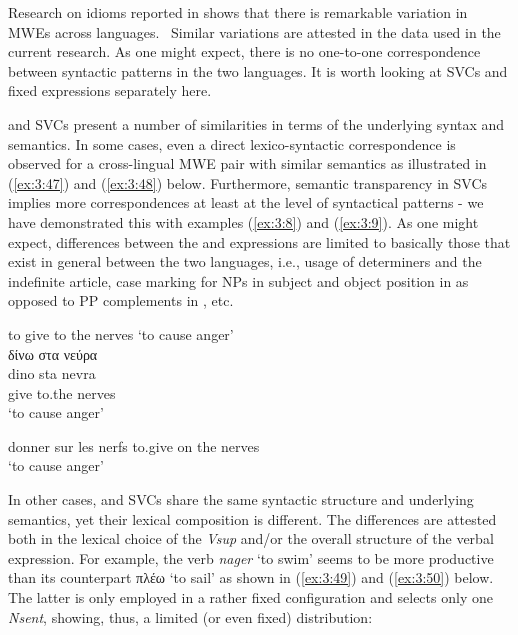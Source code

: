 \documentclass[output=paper]{langsci/langscibook}
\begin{document}
Research on idioms reported in \cite{villavicencio2004} shows that
there is remarkable variation in MWEs across languages. \ Similar
variations are attested in the data used in the current research. As
one might expect, there is no one-to-one correspondence between
syntactic patterns in the two languages. It is worth looking at SVCs
and fixed expressions separately here.



 and  SVCs present a number of similarities in terms of the
underlying syntax and semantics. In some cases, even a direct
lexico-syntactic correspondence is observed for a cross-lingual MWE
pair with similar semantics as illustrated in (\ref{ex:3:47}) and (\ref{ex:3:48}) below.
Furthermore, semantic transparency in SVCs implies more correspondences
at least at the level of syntactical patterns - we have demonstrated this with examples (\ref{ex:3:8}) and
(\ref{ex:3:9}). As one might expect, differences between the  and 
expressions are limited to basically those that exist in general
between the two languages, i.e., usage of determiners and the
indefinite article, case marking for NPs in subject and object position
in  as opposed to PP complements in , etc.

\begin{exe}
\ex \label{ex:3:47}
to give to the nerves `to cause anger'\\
\glll δίνω στα νεύρα \\
dino sta nevra\\
give to.the nerves\\
\glt %
‘to cause anger’
\end{exe}

\begin{exe}
\ex \label{ex:3:48} donner sur les nerfs
\glt to.give on the nerves\\
‘to cause anger’
\end{exe}



In other cases,  and  SVCs share the same syntactic structure and
underlying semantics, yet their lexical composition is different. The
differences are attested both in the lexical choice of the
\textit{Vsup} and/or the overall structure of the verbal expression.
For example, the  verb \textit{nager} ‘to swim’ seems to
be more productive than its  counterpart πλέω ‘to sail’ as
shown in (\ref{ex:3:49}) and (\ref{ex:3:50}) below. The latter is only employed in a rather
fixed configuration and selects only one \textit{Nsent}, showing, thus,
a limited (or even fixed) distribution: 
\end{document}
